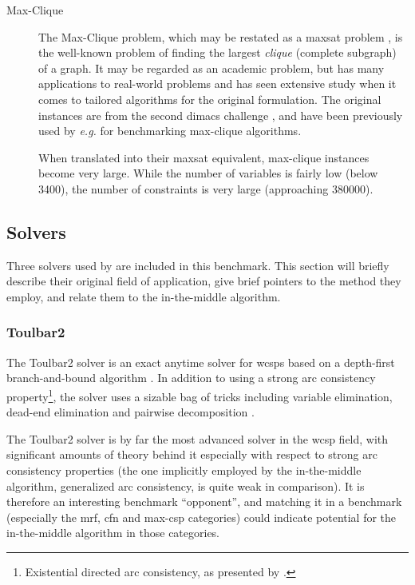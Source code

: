 \begin{description}
	\item[Max-Clique]
		The Max-Clique problem, which may be restated as a \gls{maxsat} problem \parencite{Heras08}, is the well-known problem of finding the largest \emph{clique} (complete subgraph) of a graph.
		It may be regarded as an academic problem, but has many applications to real-world problems and has seen extensive study when it comes to tailored algorithms for the original formulation.
		The original instances are from the second \gls{dimacs} challenge \parencite{Johnson96}, and have been previously used by \emph{e.g.} \textcite{Östergård02} for benchmarking max-clique algorithms.

		When translated into their \gls{maxsat} equivalent, max-clique instances become very large. While the number of variables is fairly low (below \num{3400}), the number of constraints is very large (approaching \num{380000}).
\end{description}

\subsection{Solvers}
Three solvers used by \textcite{deGivry14} are included in this benchmark.
This section will briefly describe their original field of application, give brief pointers to the method they employ, and relate them to the in-the-middle algorithm.

\subsubsection{Toulbar2}
The Toulbar2 solver is an exact anytime solver for \glspl{wcsp} based on a depth-first branch-and-bound algorithm \parencite{Allouche10}.
In addition to using a strong arc consistency property\footnote{Existential directed arc consistency, as presented by \textcite{deGivry05}.}, the solver uses a sizable bag of tricks including variable elimination, dead-end elimination \parencite{deGivry13} and pairwise decomposition \parencite{Favier11}.

The Toulbar2 solver is by far the most advanced solver in the \gls{wcsp} field, with significant amounts of theory behind it especially with respect to strong arc consistency properties (the one implicitly employed by the in-the-middle algorithm, generalized arc consistency, is quite weak in comparison).
It is therefore an interesting benchmark \enquote{opponent}, and matching it in a benchmark (especially the \gls{mrf}, \gls{cfn} and max-\gls{csp} categories) could indicate potential for the in-the-middle algorithm in those categories.

